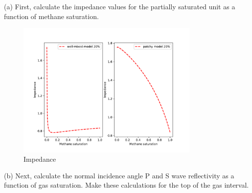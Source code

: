 \begin{problem}{(a)}
    First, calculate the impedance values for the partially saturated unit as a function of methane saturation.
\end{problem}

\begin{solution}
    \begin{figure}[H]
        \centering
        \includegraphics[width=0.8\textwidth]{figures/homework-2/p1-3-a.pdf}
        \caption{Impedance}
        \label{fig:p1-3-a}
    \end{figure}
\end{solution}

\begin{problem}{(b)}
    Next, calculate the normal incidence angle P and S wave reflectivity as a function of gas saturation. Make these calculations for the top of the gas interval.
\end{problem}

